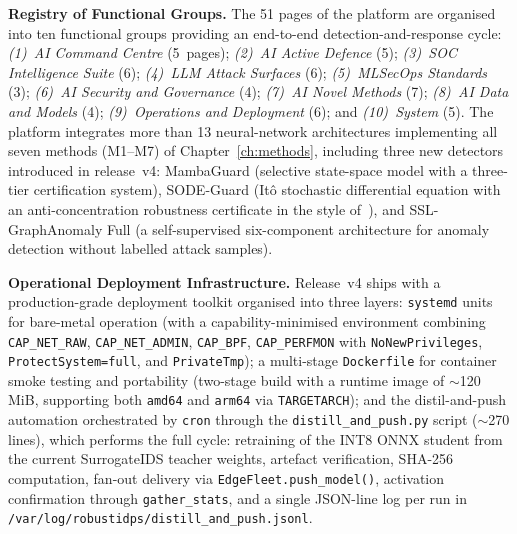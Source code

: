 \noindent\textbf{Registry of Functional Groups.} The 51 pages of
the platform are organised into ten functional groups providing
an end-to-end detection-and-response cycle: \emph{(1)~AI Command
Centre} (5~pages); \emph{(2)~AI Active Defence} (5); \emph{(3)~SOC
Intelligence Suite} (6); \emph{(4)~LLM Attack Surfaces} (6);
\emph{(5)~MLSecOps Standards} (3); \emph{(6)~AI Security and
Governance} (4); \emph{(7)~AI Novel Methods} (7); \emph{(8)~AI
Data and Models} (4); \emph{(9)~Operations and Deployment} (6);
and \emph{(10)~System} (5). The platform integrates more than 13
neural-network architectures implementing all seven methods
(M1--M7) of Chapter~\ref{ch:methods}, including three new
detectors introduced in release~v4: \textsf{MambaGuard}
(selective state-space model with a three-tier certification
system), \textsf{SODE-Guard} (It\^o stochastic differential
equation with an anti-concentration robustness certificate in the
style of~\cite{Cohen2019}), and \textsf{SSL-GraphAnomaly Full}
(a self-supervised six-component architecture for anomaly
detection without labelled attack samples).

\noindent\textbf{Operational Deployment Infrastructure.}
Release~v4 ships with a production-grade deployment toolkit
organised into three layers: \texttt{systemd} units for
bare-metal operation (with a capability-minimised environment
combining \texttt{CAP\_NET\_RAW}, \texttt{CAP\_NET\_ADMIN},
\texttt{CAP\_BPF}, \texttt{CAP\_PERFMON} with
\texttt{NoNewPrivileges}, \texttt{ProtectSystem=full}, and
\texttt{PrivateTmp}); a multi-stage \texttt{Dockerfile} for
container smoke testing and portability (two-stage build with a
runtime image of $\sim$120\,MiB, supporting both \texttt{amd64}
and \texttt{arm64} via \texttt{TARGETARCH}); and the
distil-and-push automation orchestrated by \texttt{cron} through
the \texttt{distill\_and\_push.py} script ($\sim$270 lines),
which performs the full cycle: retraining of the INT8 ONNX
student from the current \textsf{SurrogateIDS} teacher weights,
artefact verification, SHA-256 computation, fan-out delivery via
\texttt{EdgeFleet.push\_model()}, activation confirmation through
\texttt{gather\_stats}, and a single JSON-line log per run in
\texttt{/var/log/robustidps/distill\_and\_push.jsonl}.


